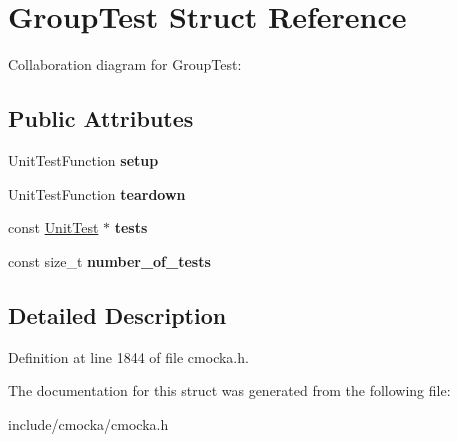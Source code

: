 \hypertarget{structGroupTest}{}\section{Group\+Test Struct Reference}
\label{structGroupTest}


Collaboration diagram for Group\+Test\+:
\subsection*{Public Attributes}
\begin{DoxyCompactItemize}
\item 
\mbox{\label{structGroupTest_abb15632448009bde536e8187afa2831d}} 
Unit\+Test\+Function {\bfseries setup}
\item 
\mbox{\label{structGroupTest_a59b4a5d3b725b3f625dee8f7fd55cd30}} 
Unit\+Test\+Function {\bfseries teardown}
\item 
\mbox{\label{structGroupTest_a4365c3917e4b03ac03edbeedc4a24aeb}} 
const \hyperlink{structUnitTest}{Unit\+Test} $\ast$ {\bfseries tests}
\item 
\mbox{\label{structGroupTest_af72995fabd94fe9ef4da280475d26762}} 
const size\+\_\+t {\bfseries number\+\_\+of\+\_\+tests}
\end{DoxyCompactItemize}


\subsection{Detailed Description}


Definition at line 1844 of file cmocka.\+h.



The documentation for this struct was generated from the following file\+:\begin{DoxyCompactItemize}
\item 
include/cmocka/cmocka.\+h\end{DoxyCompactItemize}
